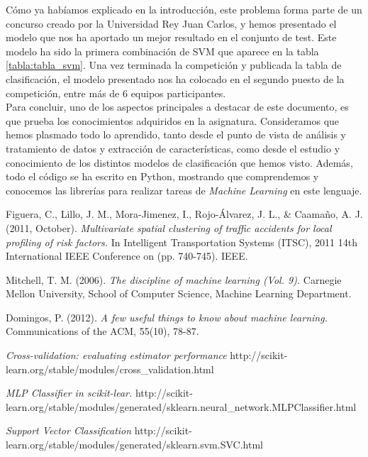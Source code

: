 \documentclass[journal,twoside]{JoPhA}
\begin{document}
Cómo ya habíamos explicado en la introducción, este problema forma parte de un concurso creado por la Universidad Rey Juan Carlos, y hemos presentado el modelo que nos ha aportado un mejor resultado en el conjunto de test. Este modelo ha sido la primera combinación de SVM que aparece en la tabla \ref{tabla:tabla_svm}. Una vez terminada la competición y publicada la tabla de clasificación, el modelo presentado nos ha colocado en el segundo puesto de la competición, entre más de 6 equipos participantes.\\

Para concluir, uno de los aspectos principales a destacar de este documento, es que prueba los conocimientos adquiridos en la asignatura. Consideramos que hemos plasmado todo lo aprendido, tanto desde el punto de vista de análisis y tratamiento de datos y extracción de características, como desde el estudio y conocimiento de los distintos modelos de clasificación que hemos visto. Además, todo el código se ha escrito en Python, mostrando que comprendemos y conocemos las librerías para realizar tareas de \textit{Machine Learning} en este lenguaje.

\begin{thebibliography}{1}

Figuera, C., Lillo, J. M., Mora-Jimenez, I., Rojo-Álvarez, J. L., \& Caamaño, A. J. (2011, October). \emph{Multivariate spatial clustering of traffic accidents for local profiling of risk factors.} In Intelligent Transportation Systems (ITSC), 2011 14th International IEEE Conference on (pp. 740-745). IEEE.

Mitchell, T. M. (2006). \emph{The discipline of machine learning (Vol. 9).} Carnegie Mellon University, School of Computer Science, Machine Learning Department.

Domingos, P. (2012). \emph{A few useful things to know about machine learning.} Communications of the ACM, 55(10), 78-87.

\emph{Cross-validation: evaluating estimator performance} http://scikit-learn.org/stable/modules/cross\_validation.html

\emph{MLP Classifier in scikit-lear.}
http://scikit-learn.org/stable/modules/generated/sklearn.neural\_network.MLPClassifier.html

\emph{Support Vector Classification}
http://scikit-learn.org/stable/modules/generated/sklearn.svm.SVC.html

\end{thebibliography}
\end{document}
